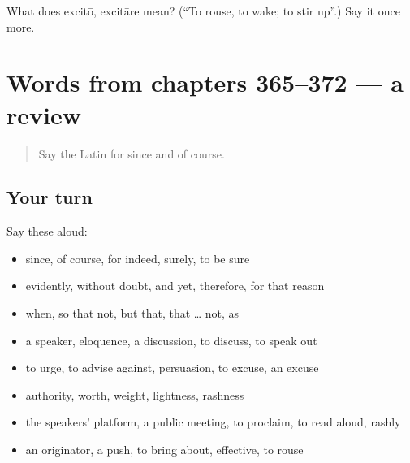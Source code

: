 \begin{tcolorbox}[breakable,colback=teal!4,colframe=teal!35!black,title={Before you move on}]
What does excitō, excitāre mean? (\textquotedblleft{}To rouse, to wake; to stir up\textquotedblright{}.) Say it once more.
\end{tcolorbox}
\section[(dialogue)]{Words from chapters 365–372 — a review}

\label{lesson:LA-R372-review-365-372}



\begin{quote}
Say the Latin for since and of course.
\end{quote}

\subsection*{Your turn}
Say these aloud:

\begin{itemize}
\raggedright
  \item since, of course, for indeed, surely, to be sure
  \item evidently, without doubt, and yet, therefore, for that reason
  \item when, so that not, but that, that … not, as
  \item a speaker, eloquence, a discussion, to discuss, to speak out
  \item to urge, to advise against, persuasion, to excuse, an excuse
  \item authority, worth, weight, lightness, rashness
  \item the speakers' platform, a public meeting, to proclaim, to read aloud, rashly
  \item an originator, a push, to bring about, effective, to rouse
\end{itemize}

